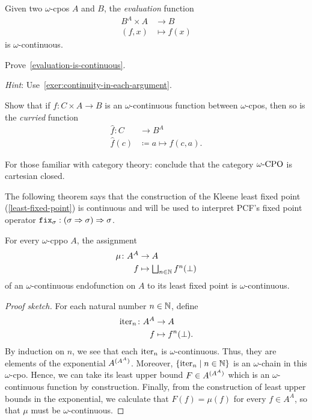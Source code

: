 \begin{lemma}\label{evaluation-is-continuous}
  Given two \(\omega\)-cpos \(A\) and \(B\), the \emph{evaluation} function
  \begin{align*}
    B^A \times A &\to B \\
    (f,x) &\mapsto f(x)
  \end{align*}
  is \(\omega\)-continuous.
\end{lemma}
\begin{exercise}\label{exer:evaluation-is-continuous}
  Prove~\cref{evaluation-is-continuous}.

  \emph{Hint}: Use~\cref{exer:continuity-in-each-argument}.
\end{exercise}

\begin{exercise}\label{exer:curry-is-continuous}
  Show that if \(f \colon C \times A \to B\) is an \(\omega\)-continuous
  function between \(\omega\)-cpos, then so is the \emph{curried} function
  \begin{align*}
    \hat{f} \colon C &\to B^A \\
    \hat{f}(c) &\coloneqq a \mapsto f(c,a).
  \end{align*}

  For those familiar with category theory: conclude that the category
  \(\omegaCPO\) is cartesian closed.
\end{exercise}

The following theorem says that the construction of the Kleene least fixed point
(\cref{least-fixed-point}) is continuous and will be used to interpret PCF's
fixed point operator
\(\pcffix_\sigma : \pa*{\sigma \pcffun \sigma} \pcffun \sigma\).
\begin{theorem}\label{least-fixed-point-is-continuous}
  For every \(\omega\)-cppo \(A\), the assignment
  \begin{align*}
    \mu \colon A^A &\to A \\
    f &\mapsto \textstyle\bigsqcup_{n \in \Nat}f^n(\bot)
  \end{align*}
  of an \(\omega\)-continuous endofunction on \(A\) to its least fixed point is
  \(\omega\)-continuous.
\end{theorem}
\begin{proof}[Proof sketch]
  For each natural number \(n \in \Nat\), define
  \begin{align*}
    \iter_n \colon A^A &\to A \\
    f &\mapsto f^n(\bot).
  \end{align*}
  By induction on \(n\), we see that each \(\iter_n\) is \(\omega\)-continuous.
  Thus, they are elements of the exponential \(A^{\pa{A^A}}\).
  Moreover, \(\set{\iter_n \mid n \in \Nat}\) is an \(\omega\)-chain in this
  \(\omega\)-cpo.
  Hence, we can take its least upper bound \(F \in A^{\pa{A^A}}\) which is an
  \(\omega\)-continuous function by construction.
  Finally, from the construction of least upper bounds in the exponential, we
  calculate that \(F(f) = \mu(f)\) for every \(f \in A^A\), so that \(\mu\)
  must be \(\omega\)-continuous.
\end{proof}

